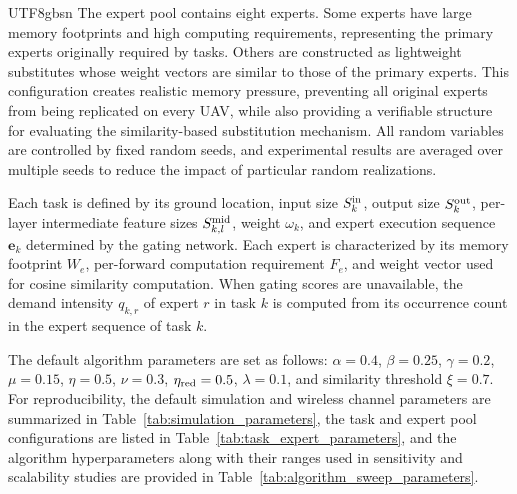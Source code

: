 \documentclass[journal]{IEEEtran}
\begin{document}
\begin{CJK*}{UTF8}{gbsn}
The expert pool contains eight experts. Some experts have large memory footprints and high computing requirements, representing the primary experts originally required by tasks. Others are constructed as lightweight substitutes whose weight vectors are similar to those of the primary experts. This configuration creates realistic memory pressure, preventing all original experts from being replicated on every UAV, while also providing a verifiable structure for evaluating the similarity-based substitution mechanism. All random variables are controlled by fixed random seeds, and experimental results are averaged over multiple seeds to reduce the impact of particular random realizations.

Each task is defined by its ground location, input size \(S_k^{\rm in}\), output size \(S_k^{\rm out}\), per-layer intermediate feature sizes \(S_{k,l}^{\rm mid}\), weight \(\omega_k\), and expert execution sequence \(\mathbf{e}_k\) determined by the gating network. Each expert is characterized by its memory footprint \(W_e\), per-forward computation requirement \(F_e\), and weight vector used for cosine similarity computation. When gating scores are unavailable, the demand intensity \(q_{k,r}\) of expert \(r\) in task \(k\) is computed from its occurrence count in the expert sequence of task \(k\).

The default algorithm parameters are set as follows: \(\alpha=0.4\), \(\beta=0.25\), \(\gamma=0.2\), \(\mu=0.15\), \(\eta=0.5\), \(\nu=0.3\), \(\eta_{\rm red}=0.5\), \(\lambda=0.1\), and similarity threshold \(\xi=0.7\). For reproducibility, the default simulation and wireless channel parameters are summarized in Table~\ref{tab:simulation_parameters}, the task and expert pool configurations are listed in Table~\ref{tab:task_expert_parameters}, and the algorithm hyperparameters along with their ranges used in sensitivity and scalability studies are provided in Table~\ref{tab:algorithm_sweep_parameters}.


\end{CJK*}
\end{document}
